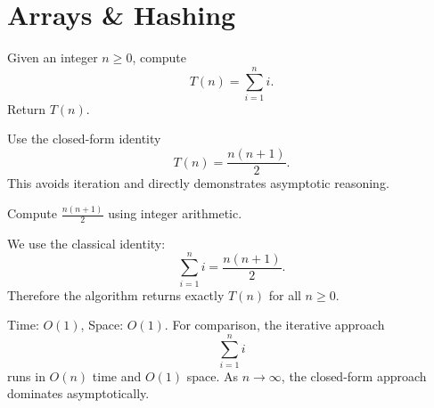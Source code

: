 \section{Arrays \& Hashing}


\ProblemSummary
Given an integer $n \ge 0$, compute
\[
T(n) = \sum_{i=1}^{n} i.
\]
Return $T(n)$.

\KeyIdea
Use the closed-form identity
\[
T(n) = \frac{n(n+1)}{2}.
\]
This avoids iteration and directly demonstrates asymptotic reasoning.

\Algorithm
Compute $\frac{n(n+1)}{2}$ using integer arithmetic.

\Correctness
We use the classical identity:
\[
\sum_{i=1}^{n} i = \frac{n(n+1)}{2}.
\]
Therefore the algorithm returns exactly $T(n)$ for all $n \ge 0$.

\Complexity
Time: $O(1)$, Space: $O(1)$.
For comparison, the iterative approach
\[
\sum_{i=1}^{n} i
\]
runs in $O(n)$ time and $O(1)$ space.
As $n \to \infty$, the closed-form approach dominates asymptotically.


